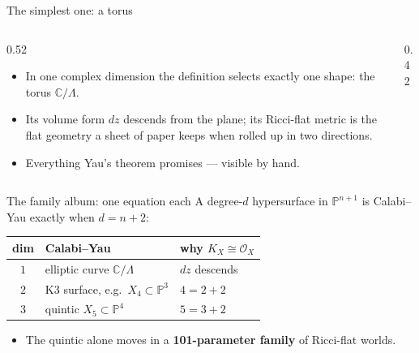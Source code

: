\documentclass[aspectratio=169]{beamer}
\begin{document}
\begin{frame}{The simplest one: a torus}
  \begin{columns}[c]
    \begin{column}{0.52\textwidth}
      \begin{itemize}
        \item In one complex dimension the definition selects exactly one
              shape: the torus $\mathbb{C}/\Lambda$.
        \item Its volume form $dz$ descends from the plane; its Ricci-flat
              metric is the flat geometry a sheet of paper keeps when rolled
              up in two directions.
        \item Everything Yau's theorem promises — visible by hand.
      \end{itemize}
    \end{column}
    \begin{column}{0.42\textwidth}
    \end{column}
  \end{columns}
\end{frame}

\begin{frame}{The family album: one equation each}
  A degree-$d$ hypersurface in $\mathbb{P}^{n+1}$ is Calabi–Yau exactly
  when $d = n + 2$:
  \vspace{0.5em}
  \begin{center}
    \begin{tabular}{c l l}
      \toprule
      \textbf{dim} & \textbf{Calabi–Yau} & \textbf{why $K_X \cong \mathcal{O}_X$} \\
      \midrule
      $1$ & elliptic curve $\mathbb{C}/\Lambda$ & $dz$ descends \\
      $2$ & K3 surface, e.g.\ $X_4 \subset \mathbb{P}^3$ & $4 = 2 + 2$ \\
      $3$ & quintic $X_5 \subset \mathbb{P}^4$ & $5 = 3 + 2$ \\
      \bottomrule
    \end{tabular}
  \end{center}
  \vspace{0.5em}
  \begin{itemize}
    \item The quintic alone moves in a \textbf{101-parameter family} of
          Ricci-flat worlds.
  \end{itemize}
\end{frame}
\end{document}
